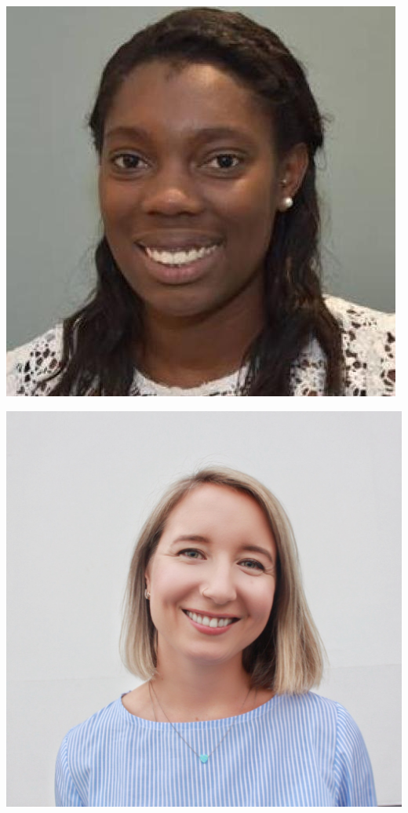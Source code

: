 \documentclass{beamer}
\begin{document}
\begin{frame}


\begin{center}
	\begin{minipage}{0.32\linewidth}
		\includegraphics[width=\linewidth,height=\linewidth]{Figures/Amarise-little.jpg}
	\end{minipage}
	\begin{minipage}{0.32\linewidth}
		\includegraphics[width=\linewidth,height=\linewidth]{Figures/anyamikhaylova.jpg}

\end{minipage}
\end{center}
\end{frame}
\end{document}
